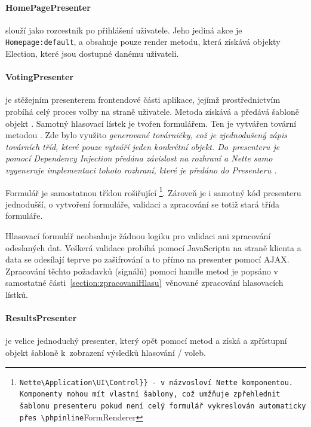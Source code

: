 \paragraph{HomePagePresenter} slouží jako rozcestník po přihlášení uživatele. Jeho jediná akce je \texttt{Homepage:default}, a obsahuje pouze render metodu, která získává objekty Election, které jsou dostupné danému uživateli.


\paragraph{VotingPresenter} je stěžejním presenterem frontendové části aplikace, jejímž prostřednictvím probíhá celý proces volby na straně uživatele. Metoda  získává a   předává šabloně objekt . Samotný hlasovací lístek je tvořen formulářem. Ten je vytvářen tovární metodou . Zde bylo využito \it{generované továrničky}, což je zjednodušený zápis továrních tříd, které pouze vytváří jeden konkrétní objekt. Do~presenteru je pomocí Dependency Injection předána závislost na rozhraní  a Nette samo vygeneruje implementaci tohoto rozhraní, které je předáno do Presenteru \cite{Planette}.

Formulář  je samostatnou třídou rošiřující \footnote{\Verb{Nette\Application\UI\Control}} - v názvosloví Nette komponentou. Komponenty mohou mít vlastní šablony, což umžňuje zpřehlednit šablonu presenteru pokud není celý formulář vykreslován automaticky přes \phpinline{FormRenderer}. Zároveň je i samotný kód presenteru jednodušší, o vytvoření formuláře, validaci a zpracování se totiž stará třída formuláře.

Hlasovací formulář neobsahuje žádnou logiku pro validaci ani zpracování odeslaných dat. Veškerá validace probíhá pomocí JavaScriptu na straně klienta a data se odesílají teprve po zašifrování a to přímo na presenter pomocí AJAX. Zpracování těchto požadavků (signálů) pomocí handle metod je popsáno v samostatné části~\ref{section:zpracovaniHlasu}~věnované zpracování hlasovacích lístků.


\paragraph{ResultsPresenter} je velice jednoduchý presenter, který opět pomocí metod  a  získá a zpřístupní objekt  šabloně k~zobrazení výsledků hlasování / voleb.



